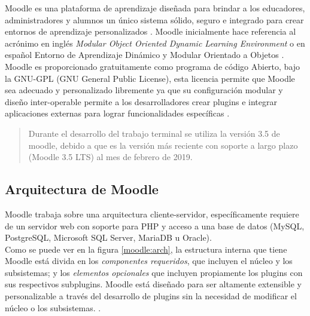  Moodle es una plataforma de aprendizaje diseñada para brindar a los educadores, administradores
 y alumnos un único sistema sólido, seguro e integrado para crear entornos de aprendizaje personalizados \cite{aboutMoodle}.
 Moodle inicialmente hace referencia al acrónimo en inglés {\it Modular Object Oriented Dynamic
 Learning Environment} o en español Entorno de Aprendizaje Dinámico y Modular Orientado a Objetos \cite{aboutMoodle19}.\\


 \noindent Moodle es proporcionado gratuitamente como programa de código Abierto, bajo la GNU-GPL
 (GNU General Public License), esta licencia permite que Moodle sea adecuado y personalizado libremente
 ya que su configuración modular y diseño inter-operable permite a los desarrolladores crear plugins
 e integrar aplicaciones externas para lograr funcionalidades específicas \cite{aboutMoodle}.


    \begin{quote}
    Durante el desarrollo del trabajo terminal se utiliza la versión 3.5 de moodle,
    debido a que es la versión más reciente con soporte a largo plazo (Moodle 3.5 LTS)
    al mes de febrero de 2019. \cite{moodleHistorial}
    \end{quote}


\subsection{Arquitectura de Moodle}

 Moodle trabaja sobre una arquitectura cliente-servidor, específicamente requiere de un servidor web
 con soporte para PHP y acceso a una base de datos (MySQL, PostgreSQL, Microsoft SQL Server, MariaDB
 u Oracle).\\

 \noindent Como se puede ver en la figura \ref{moodle:arch}, la estructura interna que tiene Moodle está
 divida en los {\it componentes requeridos}, que incluyen el núcleo y los subsistemas; y los {\it elementos
 opcionales} que incluyen propiamente los plugins con sus respectivos subplugins. Moodle está diseñado para
 ser altamente extensible y personalizable a través del desarrollo de plugins sin la necesidad de modificar
 el núcleo o los subsistemas. \cite{moodleArch}.

